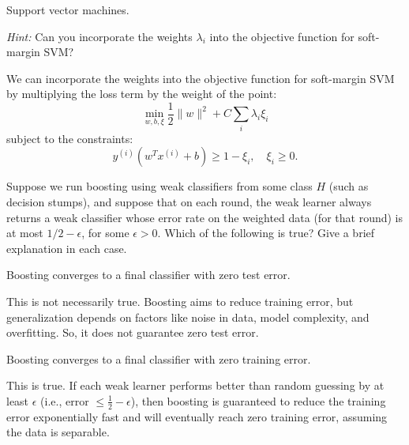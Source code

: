 \documentclass{article}
\begin{document}
\begin{probset}
\begin{prob}
\begin{subprobset}
    \begin{subprob}
        Support vector machines.

        \textit{Hint:} Can you incorporate the weights $\lambda_i$ into the objective function for soft-margin SVM?

        \begin{soln}
            We can incorporate the weights into the objective function for soft-margin SVM by multiplying the loss term by the weight of the point:
            \[
                \min_{w, b, \xi} \frac{1}{2}\|w\|^2 + C \sum_{i} \lambda_i \xi_i
            \]
            subject to the constraints:
            \[
                y^{(i)}(w^T x^{(i)} + b) \geq 1 - \xi_i, \quad \xi_i \geq 0.
            \]
        \end{soln}
    \end{subprob}
    \end{subprobset}
\end{prob}

\newpage

\begin{prob}
    Suppose we run boosting using weak classifiers from some class $H$ (such as decision stumps), and suppose that on each round, the weak learner always returns a weak classifier whose error rate on the weighted data (for that round) is at most $1/2 - \epsilon$, for some $\epsilon > 0$. Which of the following is true? Give a brief explanation in each case.

    \begin{subprobset}
    \begin{subprob}
        Boosting converges to a final classifier with zero test error.

        \begin{soln}
             This is not necessarily true. Boosting aims to reduce training error, but generalization depends on factors like noise in data, model complexity, and overfitting. So, it does not guarantee zero test error.
        \end{soln}
    \end{subprob}

    \begin{subprob}
        Boosting converges to a final classifier with zero training error.

        \begin{soln}
            This is true. If each weak learner performs better than random guessing by at least $\epsilon$ (i.e., error $\leq \frac{1}{2} - \epsilon$), then boosting is guaranteed to reduce the training error exponentially fast and will eventually reach zero training error, assuming the data is separable.
        \end{soln}
    \end{subprob}


\end{subprobset}
\end{prob}
\end{probset}
\end{document}
